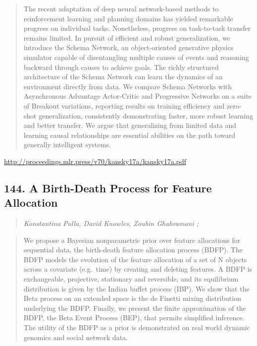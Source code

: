 \documentclass{article}
\begin{document}
\begin{quote}
    The recent adaptation of deep neural network-based methods to reinforcement learning and planning domains has yielded remarkable progress on individual tasks. Nonetheless, progress on task-to-task transfer remains limited. In pursuit of efficient and robust generalization, we introduce the Schema Network, an object-oriented generative physics simulator capable of disentangling multiple causes of events and reasoning backward through causes to achieve goals. The richly structured architecture of the Schema Network can learn the dynamics of an environment directly from data. We compare Schema Networks with Asynchronous Advantage Actor-Critic and Progressive Networks on a suite of Breakout variations, reporting results on training efficiency and zero-shot generalization, consistently demonstrating faster, more robust learning and better transfer. We argue that generalizing from limited data and learning causal relationships are essential abilities on the path toward generally intelligent systems.  \end{quote}

\href{http://proceedings.mlr.press/v70/kansky17a/kansky17a.pdf}{http://proceedings.mlr.press/v70/kansky17a/kansky17a.pdf}

\subsection{144. A Birth-Death Process for Feature Allocation}

\begin{quote}
\footnotesize{\textit{Konstantina Palla, David Knowles, Zoubin Ghahramani ;}}
\end{quote}

\begin{quote}
    We propose a Bayesian nonparametric prior over feature allocations for sequential data, the birth-death feature allocation process (BDFP). The BDFP models the evolution of the feature allocation of a set of N objects across a covariate (e.g.~time) by creating and deleting features. A BDFP is exchangeable, projective, stationary and reversible, and its equilibrium distribution is given by the Indian buffet process (IBP). We show that the Beta process on an extended space is the de Finetti mixing distribution underlying the BDFP. Finally, we present the finite approximation of the BDFP, the Beta Event Process (BEP), that permits simplified inference. The utility of the BDFP as a prior is demonstrated on real world dynamic genomics and social network data.  \end{quote}
\end{document}
